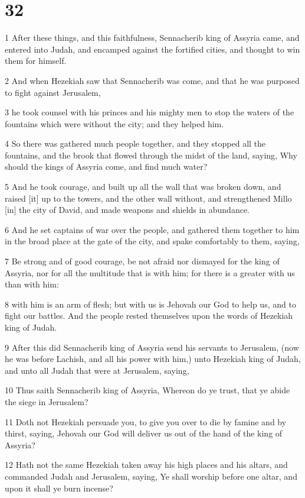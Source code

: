 \chapter{32}

\par 1 After these things, and this faithfulness, Sennacherib king of Assyria came, and entered into Judah, and encamped against the fortified cities, and thought to win them for himself.
\par 2 And when Hezekiah saw that Sennacherib was come, and that he was purposed to fight against Jerusalem,
\par 3 he took counsel with his princes and his mighty men to stop the waters of the fountains which were without the city; and they helped him.
\par 4 So there was gathered much people together, and they stopped all the fountains, and the brook that flowed through the midst of the land, saying, Why should the kings of Assyria come, and find much water?
\par 5 And he took courage, and built up all the wall that was broken down, and raised [it] up to the towers, and the other wall without, and strengthened Millo [in] the city of David, and made weapons and shields in abundance.
\par 6 And he set captains of war over the people, and gathered them together to him in the broad place at the gate of the city, and spake comfortably to them, saying,
\par 7 Be strong and of good courage, be not afraid nor dismayed for the king of Assyria, nor for all the multitude that is with him; for there is a greater with us than with him:
\par 8 with him is an arm of flesh; but with us is Jehovah our God to help us, and to fight our battles. And the people rested themselves upon the words of Hezekiah king of Judah.
\par 9 After this did Sennacherib king of Assyria send his servants to Jerusalem, (now he was before Lachish, and all his power with him,) unto Hezekiah king of Judah, and unto all Judah that were at Jerusalem, saying,
\par 10 Thus saith Sennacherib king of Assyria, Whereon do ye trust, that ye abide the siege in Jerusalem?
\par 11 Doth not Hezekiah persuade you, to give you over to die by famine and by thirst, saying, Jehovah our God will deliver us out of the hand of the king of Assyria?
\par 12 Hath not the same Hezekiah taken away his high places and his altars, and commanded Judah and Jerusalem, saying, Ye shall worship before one altar, and upon it shall ye burn incense?
